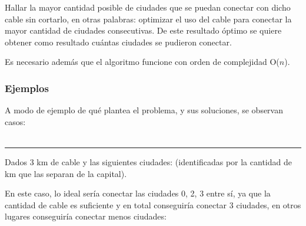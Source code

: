 \documentclass[11pt]{article}
\begin{document}
Hallar la mayor cantidad posible de ciudades que se puedan conectar con dicho cable sin cortarlo, en otras palabras: optimizar el uso del cable para conectar la mayor cantidad de ciudades consecutivas.
De este resultado óptimo se quiere obtener como resultado cuántas ciudades se pudieron conectar.

Es necesario además que el algoritmo funcione con orden de complejidad O($n$).


\subsubsection{Ejemplos}

A modo de ejemplo de qué plantea el problema, y sus soluciones, se observan casos:\\ \\

\noindent\rule{13cm}{0.4pt}


Dados 3 km de cable y las siguientes ciudades: (identificadas por la cantidad de km que las separan de la capital).\\

\begin{figure}[H]
\end{figure}

En este caso, lo ideal sería conectar las ciudades 0, 2, 3 entre sí, ya que la cantidad de cable es suficiente y en total conseguiría conectar 3 ciudades, en otros lugares conseguiría conectar menos ciudades:\\

\begin{figure}[H]
\end{figure}
\end{document}
